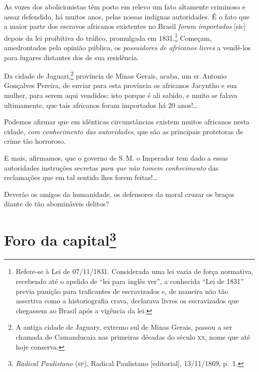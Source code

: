 As vozes dos abolicionistas têm posto em relevo um fato altamente
criminoso e assaz defendido, há muitos anos, pelas nossas indignas
autoridades. É o fato que a maior parte dos escravos africanos
existentes no Brasil \emph{foram importados} {[}sic{]} depois da lei
proibitiva do tráfico, promulgada em 1831.\footnote{Refere-se à Lei de
  07/11/1831. Considerada uma lei vazia de força normativa, recebendo
  até o apelido de ``lei para inglês ver'', a conhecida ``Lei de 1831''
  previa punição para traficantes de escravizados e, de maneira não tão
  assertiva como a historiografia crava, declarava livres os
  escravizados que chegassem ao Brasil após a vigência da lei.} Começam,
amedrontados pela opinião pública, os \emph{possuidores de africanos
livres} a vendê-los para lugares distantes dos de sua residência.

Da cidade de Jaguari,\footnote{A antiga cidade de Jaguary, extremo sul
  de Minas Gerais, passou a ser chamada de Camanducaia nas primeiras
  décadas do século \textsc{xx}, nome que até hoje conserva.} província de Minas
Gerais, acaba, um sr.\,Antonio Gonçalves Pereira, de enviar para esta
província os africanos Jacyntho e sua mulher, para serem aqui vendidos;
isto porque é ali sabido, e muito se falava ultimamente, que tais
africanos foram importados há 20 anos!\ldots{}

Podemos afirmar que em idênticas circunstâncias existem muitos africanos
nesta cidade, \emph{com conhecimento das autoridades}, que são as
principais protetoras de crime tão horroroso.

E mais, afirmamos, que o governo de S.\,M. o Imperador tem dado a essas
autoridades instruções secretas \emph{para que não tomem conhecimento}
das reclamações que em tal sentido lhes forem feitas!\ldots

Deverão os amigos da humanidade, os defensores da moral cruzar os braços
diante de tão abomináveis delitos?

\chapter{Foro da capital\footnote{\emph{Radical Paulistano} (\textsc{sp}), Radical Paulistano {[}editorial{]},
  13/11/1869, p.~1.}}

